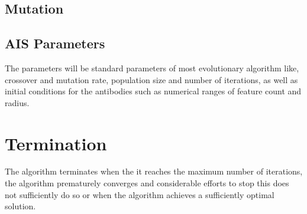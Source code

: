 \subsection{Mutation}


\subsection{AIS Parameters}
The parameters will be standard parameters of most evolutionary algorithm like, crossover and mutation rate, population size and number of iterations, as well as initial conditions for the antibodies such as numerical ranges of feature count and radius. 


\section{Termination}
The algorithm terminates when the it reaches the maximum number of iterations, the algorithm prematurely converges and considerable efforts to stop this does not sufficiently do so or when the algorithm achieves a sufficiently optimal solution.


